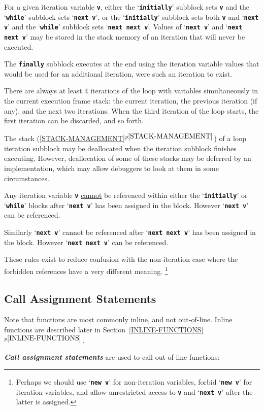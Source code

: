 \documentclass[12pt]{article}
\newcommand{\TT}[1]{{\tt \bfseries #1}}
\newcommand{\ikey}[2]{{\bf \em #1}\index{#2}}
\newcommand{\itemref}[1]{\ref{#1}$^{p\pageref{#1}}$}
\begin{document}
For a given iteration variable \TT{v},
either the `\TT{initially}' subblock sets \TT{v}
and the `\TT{while}' subblock sets `\TT{next v}',
or the `\TT{initially}' subblock sets both \TT{v} and `\TT{next v}'
and the `\TT{while}' subblock sets `\TT{next next v}'.
Values of `\TT{next v}' and `\TT{next next v}' may be stored in
the stack memory of an iteration that will never be executed.

The \TT{finally} subblock executes at the end using the iteration
variable values that would be used for an additional iteration,
were such an iteration to exist.

There are always at least 4 iterations of the loop with variables
simultaneously in the current execution frame stack: the current iteration,
the previous iteration (if any), and the next two iterations.
When the third iteration of the loop starts, the first
iteration can be discarded, and so forth.

The stack (\itemref{STACK-MANAGEMENT})
of a loop iteration subblock may be deallocated when the
iteration subblock finishes executing.
However, deallocation of some of these stacks may be deferred by
an implementation, which may allow debuggers to look at them
in some circumstances.

Any iteration variable \TT{v} \underline{cannot} be referenced
within either the `\TT{initially}' or `\TT{while}' blocks
after `\TT{next v}' has been assigned in the block.
However `\TT{next v}' can be referenced.

Similarly `\TT{next v}' cannot be referenced
after `\TT{next next v}' has been assigned in the block.
However `\TT{next next v}' can be referenced.

These rules exist to reduce confusion with the non-iteration
case where the forbidden references have a very different meaning.%
\footnote{Perhaps we should use `\TT{new v}' for non-iteration
variables, forbid `\TT{new v}' for iteration variables, and
allow unrestricted access to \TT{v} and `\TT{next v}' after the
latter is assigned.}


\subsection{Call Assignment Statements}
\label{CALL-ASSIGNMENT-STATEMENTS}

Note that functions are most commonly inline, and not out-of-line.
Inline functions are described later in Section~\itemref{INLINE-FUNCTIONS}.

\ikey{Call assignment statements}{call assignment}
are used to call out-of-line functions:
\end{document}
